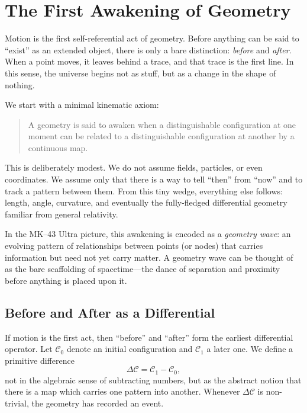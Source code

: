 \chapter{The First Awakening of Geometry}
Motion is the first self-referential act of geometry. Before anything can be
said to ``exist'' as an extended object, there is only a bare distinction:
\emph{before} and \emph{after}. When a point moves, it leaves behind a trace,
and that trace is the first line. In this sense, the universe begins not as
stuff, but as a change in the shape of nothing.

We start with a minimal kinematic axiom:

\begin{quote}
A geometry is said to awaken when a distinguishable configuration at one moment
can be related to a distinguishable configuration at another by a continuous
map.
\end{quote}

This is deliberately modest. We do not assume fields, particles, or even
coordinates. We assume only that there is a way to tell ``then'' from ``now''
and to track a pattern between them. From this tiny wedge, everything else
follows: length, angle, curvature, and eventually the fully-fledged
differential geometry familiar from general relativity.

In the MK--43 Ultra picture, this awakening is encoded as a \emph{geometry
wave}: an evolving pattern of relationships between points (or nodes) that
carries information but need not yet carry matter. A geometry wave can be
thought of as the bare scaffolding of spacetime---the dance of separation and
proximity before anything is placed upon it.

\section{Before and After as a Differential}
If motion is the first act, then ``before'' and ``after'' form the earliest
differential operator. Let $\mathcal{C}_0$ denote an initial configuration and
$\mathcal{C}_1$ a later one. We define a primitive difference
\begin{equation}
\Delta \mathcal{C} = \mathcal{C}_1 - \mathcal{C}_0,
\end{equation}
not in the algebraic sense of subtracting numbers, but as the abstract notion
that there is a map which carries one pattern into another. Whenever
$\Delta \mathcal{C}$ is non-trivial, the geometry has recorded an event.

